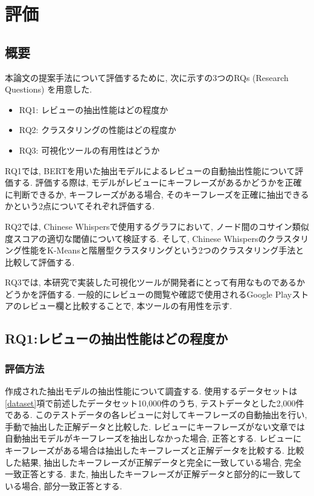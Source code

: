 \chapter{評価}
\label{chap:kekkahyouka}

\section{概要}
本論文の提案手法について評価するために, 次に示すの3つのRQs (Research Questions) を用意した. 

\begin{itemize}
  \item RQ1: レビューの抽出性能はどの程度か
  \item RQ2: クラスタリングの性能はどの程度か
  \item RQ3: 可視化ツールの有用性はどうか
\end{itemize}

RQ1では, BERTを用いた抽出モデルによるレビューの自動抽出性能について評価する. 評価する際は, モデルがレビューにキーフレーズがあるかどうかを正確に判断できるか, キーフレーズがある場合, そのキーフレーズを正確に抽出できるかという2点についてそれぞれ評価する. 

RQ2では, Chinese Whispersで使用するグラフにおいて, ノード間のコサイン類似度スコアの適切な閾値について検証する. そして, Chinese Whispersのクラスタリング性能をK-Meansと階層型クラスタリングという2つのクラスタリング手法と比較して評価する. 

RQ3では, 本研究で実装した可視化ツールが開発者にとって有用なものであるかどうかを評価する. 一般的にレビューの閲覧や確認で使用されるGoogle Playストアのレビュー欄と比較することで, 本ツールの有用性を示す. 

\section{RQ1:レビューの抽出性能はどの程度か}
\subsection{評価方法}\label{method}
作成された抽出モデルの抽出性能について調査する. 使用するデータセットは\ref{dataset}項で前述したデータセット10,000件のうち, テストデータとした2,000件である. このテストデータの各レビューに対してキーフレーズの自動抽出を行い, 手動で抽出した正解データと比較した. 
レビューにキーフレーズがない文章では自動抽出モデルがキーフレーズを抽出しなかった場合, 正答とする. レビューにキーフレーズがある場合は抽出したキーフレーズと正解データを比較する. 
比較した結果, 抽出したキーフレーズが正解データと完全に一致している場合, 完全一致正答とする. また, 抽出したキーフレーズが正解データと部分的に一致している場合, 部分一致正答とする. 

